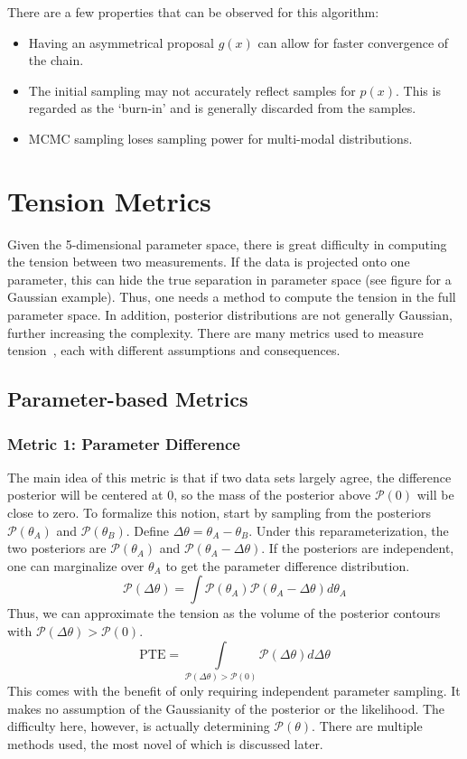 There are a few properties that can be observed for this algorithm:
\begin{itemize}
    \item Having an asymmetrical proposal $g(x)$ can allow for faster convergence of the chain.
    \item The initial sampling may not accurately reflect samples for $p(x)$. 
    This is regarded as the `burn-in' and is generally discarded from the samples.
    \item MCMC sampling loses sampling power for multi-modal distributions. 
\end{itemize}

\section{Tension Metrics}\label{sec:tension_metrics}
Given the 5-dimensional parameter space, there is great difficulty in computing the tension between two measurements. If the data is projected onto one parameter, this can hide the true separation in parameter space (see figure for a Gaussian example). Thus, one needs a method to compute the tension in the full parameter space. In addition, posterior distributions are not generally Gaussian, further increasing the complexity. There are many metrics used to measure tension~\cite{lemos_assessing_2021,seehars_quantifying_2016}, each with different assumptions and consequences.
\subsection{Parameter-based Metrics}
\subsubsection{Metric 1: Parameter Difference}
The main idea of this metric is that if two data sets largely agree, the difference posterior will be centered at 0, so the mass of the posterior above $\mathcal{P}(0)$ will be close to zero. To formalize this notion, start by sampling from the posteriors $\mathcal{P}(\theta_A)$ and $\mathcal{P}(\theta_B)$.
Define $\Delta\theta = \theta_A - \theta_B$. Under this reparameterization, the two posteriors are $\mathcal{P}(\theta_A)$ and $\mathcal{P}(\theta_A-\Delta\theta)$. If the posteriors are independent, one can marginalize over $\theta_A$ to get the parameter difference distribution.
\begin{equation}
    \mathcal{P}(\Delta\theta) = \int \mathcal{P}(\theta_A)\mathcal{P}(\theta_A - \Delta\theta) d\theta_A
\end{equation}
Thus, we can approximate the tension as the volume of the posterior contours with $\mathcal{P}(\Delta\theta)>\mathcal{P}(0)$.
\begin{equation}
    \mathrm{PTE} = \int\limits_{\mathcal{P}(\Delta\theta)>\mathcal{P}(0)}\mathcal{P}(\Delta\theta) d\Delta\theta
\end{equation}
This comes with the benefit of only requiring independent parameter sampling. It makes no assumption of the Gaussianity of the posterior or the likelihood. The difficulty here, however, is actually determining $\mathcal{P}(\theta)$. There are multiple methods used, the most novel of which is discussed later.

